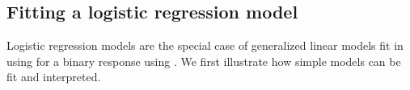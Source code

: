 \documentclass[11pt]{book}
\renewenvironment{knitrout}{\small\renewcommand{\baselinestretch}{.85}}{} %
\begin{document}
\begin{knitrout}\footnotesize
{}\color{fgcolor}\begin{kframe}
\begin{alltt}
      \hlstd{=}\hlstd{,} \hlstd{=}\hlstd{,}
                    \hlstd{=}\hlstd{,} \hlstd{=}\hlstd{,}
                    \hlstd{=}\hlstd{,} \hlstd{=}\hlstd{,} \hlstd{=}\hlstd{)}
  \hlstd{)}
\end{alltt}


{\ttfamily\noindent\bfseries\color{errorcolor}{\#\# Error: object 'Better' not found}}\end{kframe}
\end{knitrout}


\subsection{Fitting a logistic regression model}\label{sec:logist-fitting}

Logistic regression models are the special case of generalized linear models
fit in \R using  for a binary response using .
We first illustrate how simple models can be fit and interpreted.
\end{document}

